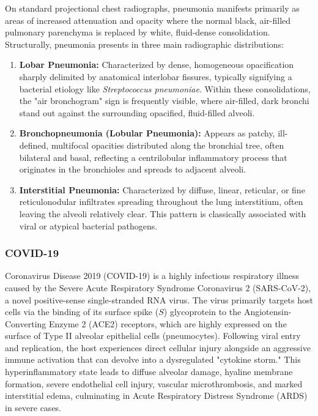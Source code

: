 On standard projectional chest radiographs, pneumonia manifests primarily as areas of increased attenuation and opacity where the normal black, air-filled pulmonary parenchyma is replaced by white, fluid-dense consolidation. Structurally, pneumonia presents in three main radiographic distributions:

\begin{enumerate}
	\item \textbf{Lobar Pneumonia:} Characterized by dense, homogeneous opacification sharply delimited by anatomical interlobar fissures, typically signifying a bacterial etiology like \textit{Streptococcus pneumoniae}. Within these consolidations, the "air bronchogram" sign is frequently visible, where air-filled, dark bronchi stand out against the surrounding opacified, fluid-filled alveoli.
	\item \textbf{Bronchopneumonia (Lobular Pneumonia):} Appears as patchy, ill-defined, multifocal opacities distributed along the bronchial tree, often bilateral and basal, reflecting a centrilobular inflammatory process that originates in the bronchioles and spreads to adjacent alveoli.
	\item \textbf{Interstitial Pneumonia:} Characterized by diffuse, linear, reticular, or fine reticulonodular infiltrates spreading throughout the lung interstitium, often leaving the alveoli relatively clear. This pattern is classically associated with viral or atypical bacterial pathogens.
\end{enumerate}

\subsubsection{COVID-19}

Coronavirus Disease 2019 (COVID-19) is a highly infectious respiratory illness caused by the Severe Acute Respiratory Syndrome Coronavirus 2 (SARS-CoV-2), a novel positive-sense single-stranded RNA virus. The virus primarily targets host cells via the binding of its surface spike ($S$) glycoprotein to the Angiotensin-Converting Enzyme 2 (ACE2) receptors, which are highly expressed on the surface of Type II alveolar epithelial cells (pneumocytes). Following viral entry and replication, the host experiences direct cellular injury alongside an aggressive immune activation that can devolve into a dysregulated "cytokine storm." This hyperinflammatory state leads to diffuse alveolar damage, hyaline membrane formation, severe endothelial cell injury, vascular microthrombosis, and marked interstitial edema, culminating in Acute Respiratory Distress Syndrome (ARDS) in severe cases.

